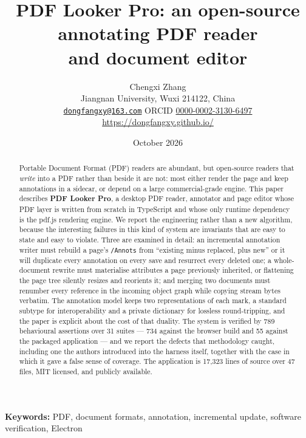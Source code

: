 \documentclass[11pt,a4paper]{article}
\title{\bfseries PDF Looker Pro: an open-source annotating PDF reader\\ and document editor}
\author{%
  Chengxi Zhang\\
  \small Jiangnan University, Wuxi 214122, China\\
  \small\href{mailto:dongfangxy@163.com}{\texttt{dongfangxy@163.com}} \quad
  ORCID \href{https://orcid.org/0000-0002-3130-6497}{0000-0002-3130-6497}\\
  \small\url{https://dongfangxy.github.io/}
}
\date{October 2026}
\begin{document}
\maketitle

\begin{abstract}
\noindent
Portable Document Format (PDF) readers are abundant, but open-source readers that
\emph{write} into a PDF rather than beside it are not: most either render the page and keep
annotations in a sidecar, or depend on a large commercial-grade engine. This paper
describes \textbf{PDF Looker Pro}, a desktop PDF reader, annotator and page editor whose
PDF layer is written from scratch in TypeScript and whose only runtime dependency is the
pdf.js rendering engine. We report the engineering rather than a new algorithm, because the
interesting failures in this kind of system are invariants that are easy to state and easy
to violate. Three are examined in detail: an incremental annotation writer must rebuild a
page's \texttt{/Annots} from ``existing minus replaced, plus new'' or it will duplicate
every annotation on every save and resurrect every deleted one; a whole-document rewrite
must materialise attributes a page previously inherited, or flattening the page tree
silently resizes and reorients it; and merging two documents must renumber every reference
in the incoming object graph while copying stream bytes verbatim. The annotation model
keeps two representations of each mark, a standard subtype for interoperability and a
private dictionary for lossless round-tripping, and the paper is explicit about the cost of
that duality. The system is verified by 789 behavioural assertions over 31 suites --- 734 against the
browser build and 55 against the packaged application --- and we report the defects that
methodology caught, including one the authors introduced into the harness itself, together
with the case in which it gave a false sense of coverage. The application is 17{,}323 lines of source over 47 files,
MIT licensed, and publicly available.
\end{abstract}

\vspace{0.4em}
\noindent\textbf{Keywords:} PDF, document formats, annotation, incremental update,
software verification, Electron












\end{document}
